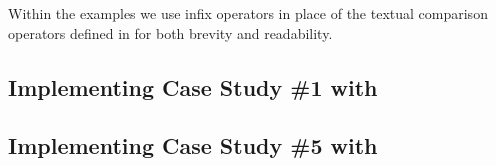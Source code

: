 Within the examples we use infix operators in place of the textual comparison operators defined in \thePolicyLang for both brevity and readability.

\subsection{Implementing Case Study \#1 with \thePolicyLang}
\label{subsec:design_impl_pol_1}



\subsection{Implementing Case Study \#5 with \thePolicyLang}
\label{subsec:design_impl_pol_5}


